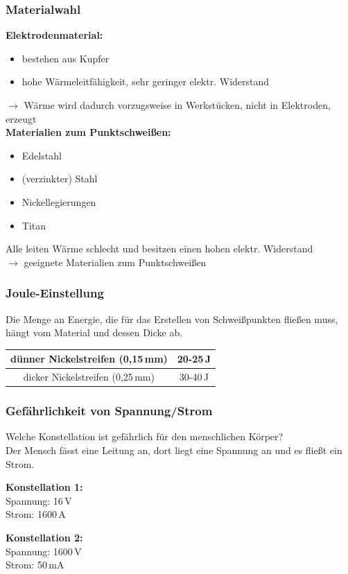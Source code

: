 \documentclass[handout, usenames,dvipsnames, nosymbols,aspectratio=169]{beamer}
\begin{document}
	\begin{frame}
		\frametitle{Materialwahl}
		\textbf{Elektrodenmaterial:}
		\begin{itemize}
			\item bestehen aus Kupfer
			\item hohe Wärmeleitfähigkeit, sehr geringer elektr. Widerstand
		\end{itemize}
		$\rightarrow$ Wärme wird dadurch vorzugsweise in Werkstücken, nicht in Elektroden, erzeugt
		\\[1em]
		\onslide<3->\textbf{Materialien zum Punktschweißen:}
		\begin{itemize}
			\item Edelstahl
			\onslide<3->\item (verzinkter) Stahl
			\onslide<3->\item Nickellegierungen
			\onslide<3->\item Titan
		\end{itemize}
		Alle leiten Wärme schlecht und besitzen einen hohen elektr. Widerstand\\
		\onslide<4->$\rightarrow$ geeignete Materialien zum Punktschweißen
	\end{frame}
	
	\begin{frame}
		\frametitle{Joule-Einstellung}
		Die Menge an Energie, die für das Erstellen von Schweißpunkten fließen muss, hängt vom Material und dessen Dicke ab.\\[2em]
		\begin{center}
		\begin{tabular}{| c | c|}
			
			\hline
			dünner Nickelstreifen (0,15\,mm) & 20-25\,J \\ 
			\hline
			dicker Nickelstreifen (0,25\,mm) & 30-40\,J \\  
			\hline 
		\end{tabular}
		\end{center}
	\end{frame}
	
	\begin{frame}%
		\frametitle{Gefährlichkeit von Spannung/Strom}
		Welche Konstellation ist gefährlich für den menschlichen Körper?\\[1em]
		Der Mensch fässt eine Leitung an, dort liegt eine Spannung an und es fließt ein Strom.\\[1em]
		\hfill
		\begin{minipage}{0.4\textwidth}
			\textbf{Konstellation 1:}\\
			Spannung: 16\,V\\
			Strom: 1600\,A\\
		\end{minipage}
		\hspace{2em}
		\begin{minipage}{0.4\textwidth}
			\textbf{Konstellation 2:}\\
			Spannung: 1600\,V\\
			Strom: 50\,mA\\
		\end{minipage}
	\end{frame}
	
\end{document}
